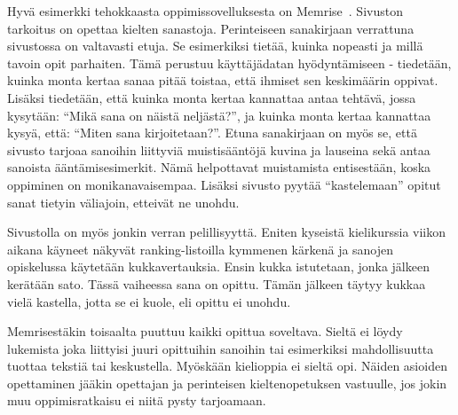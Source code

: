 \documentclass[utf8,bachelor]{gradu3}
\begin{document}






Hyvä esimerkki tehokkaasta oppimissovelluksesta on Memrise~\parencite[][]{memrise}. Sivuston tarkoitus on opettaa kielten sanastoja. Perinteiseen sanakirjaan verrattuna sivustossa on valtavasti etuja. Se esimerkiksi tietää, kuinka nopeasti ja millä tavoin opit parhaiten. Tämä perustuu käyttäjädatan hyödyntämiseen - tiedetään, kuinka monta kertaa sanaa pitää toistaa, että ihmiset sen keskimäärin oppivat. Lisäksi tiedetään, että kuinka monta kertaa kannattaa antaa tehtävä, jossa kysytään: “Mikä sana on näistä neljästä?”, ja kuinka monta kertaa kannattaa kysyä, että: “Miten sana kirjoitetaan?”. Etuna sanakirjaan on myös se, että sivusto tarjoaa sanoihin liittyviä muistisääntöjä kuvina ja lauseina sekä antaa sanoista ääntämisesimerkit. Nämä helpottavat muistamista entisestään, koska oppiminen on monikanavaisempaa. Lisäksi sivusto pyytää “kastelemaan” opitut sanat tietyin väliajoin, etteivät ne unohdu.

Sivustolla on myös jonkin verran pelillisyyttä. Eniten kyseistä kielikurssia viikon aikana käyneet näkyvät ranking-listoilla kymmenen kärkenä ja sanojen opiskelussa käytetään kukkavertauksia. Ensin kukka istutetaan, jonka jälkeen kerätään sato. Tässä vaiheessa sana on opittu. Tämän jälkeen täytyy kukkaa vielä kastella, jotta se ei kuole, eli opittu ei unohdu. 

Memrisestäkin toisaalta puuttuu kaikki opittua soveltava. Sieltä ei löydy lukemista joka liittyisi juuri opittuihin sanoihin tai esimerkiksi mahdollisuutta tuottaa tekstiä tai keskustella. Myöskään kielioppia ei sieltä opi. Näiden asioiden opettaminen jääkin opettajan ja perinteisen kieltenopetuksen vastuulle, jos jokin muu oppimisratkaisu ei niitä pysty tarjoamaan.
\end{document}
